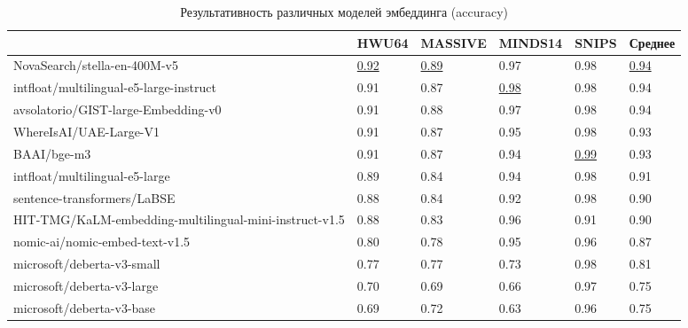 \documentclass[14pt,a4paper,oneside,openany]{extbook}
\begin{document}
\begin{table}[h!]
\caption{\label{tbl:embedding_models_accuracy}Результативность различных моделей эмбеддинга (accuracy)}
\centering
\begin{tabular}{|p{5cm}|p{2cm}|p{2cm}|p{2cm}|p{2cm}|p{2cm}|}
\hline
 & HWU64 & MASSIVE & MINDS14 & SNIPS & Среднее\\
\hline
NovaSearch/stella-en-400M-v5\autocite{zhang_jasper_2025} & \uline{0.92} & \uline{0.89} & 0.97 & 0.98 & \uline{0.94}\\
\hline
intfloat/multilingual-e5-large-instruct\autocite{wang_multilingual_2024} & 0.91 & 0.87 & \uline{0.98} & 0.98 & 0.94\\
\hline
avsolatorio/GIST-large-Embedding-v0\autocite{solatorio_gistembed_2024} & 0.91 & 0.88 & 0.97 & 0.98 & 0.94\\
\hline
WhereIsAI/UAE-Large-V1\autocite{li_angleoptimized_2024} & 0.91 & 0.87 & 0.95 & 0.98 & 0.93\\
\hline
BAAI/bge-m3\autocite{chen_bge_2024} & 0.91 & 0.87 & 0.94 & \uline{0.99} & 0.93\\
\hline
intfloat/multilingual-e5-large\autocite{wang_multilingual_2024} & 0.89 & 0.84 & 0.94 & 0.98 & 0.91\\
\hline
sentence-transformers/LaBSE & 0.88 & 0.84 & 0.92 & 0.98 & 0.90\\
\hline
HIT-TMG/KaLM-embedding-multilingual-mini-instruct-v1.5\autocite{hu_kalmembedding_2025} & 0.88 & 0.83 & 0.96 & 0.91 & 0.90\\
\hline
nomic-ai/nomic-embed-text-v1.5\autocite{nussbaum_nomic_2025} & 0.80 & 0.78 & 0.95 & 0.96 & 0.87\\
\hline
microsoft/deberta-v3-small & 0.77 & 0.77 & 0.73 & 0.98 & 0.81\\
\hline
microsoft/deberta-v3-large & 0.70 & 0.69 & 0.66 & 0.97 & 0.75\\
\hline
microsoft/deberta-v3-base & 0.69 & 0.72 & 0.63 & 0.96 & 0.75\\
\hline
\end{tabular}
\end{table}
\end{document}
